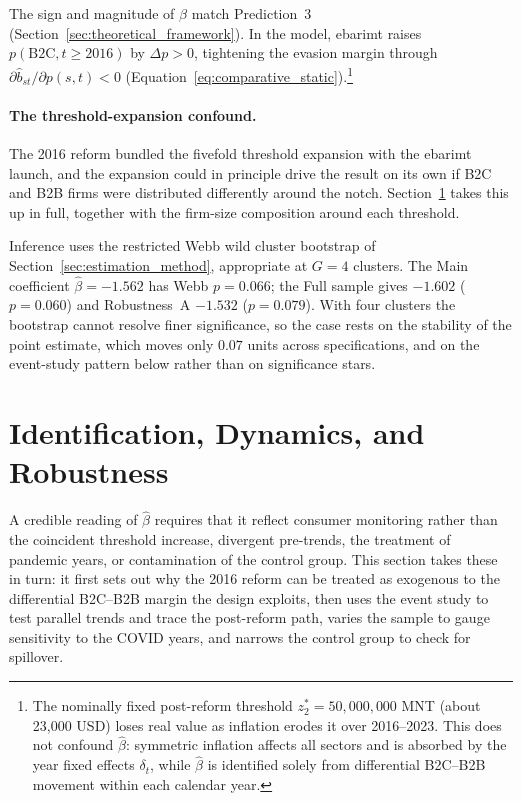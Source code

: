 \documentclass[12pt,oneside,a4paper]{report}
\begin{document}
The sign and magnitude of $\hat{\beta}$ match Prediction~3 (Section~\ref{sec:theoretical_framework}). In the model, ebarimt raises $p(\text{B2C}, t \geq 2016)$ by $\Delta p > 0$, tightening the evasion margin through $\partial\hat{b}_{st}/\partial p(s,t) < 0$ (Equation~\eqref{eq:comparative_static}).\footnote{The nominally fixed post-reform threshold $z_2^* = 50{,}000{,}000$ MNT (about 23,000 USD) loses real value as inflation erodes it over 2016--2023. This does not confound $\hat{\beta}$: symmetric inflation affects all sectors and is absorbed by the year fixed effects $\delta_t$, while $\hat{\beta}$ is identified solely from differential B2C--B2B movement within each calendar year.}

\paragraph{The threshold-expansion confound.}
The 2016 reform bundled the fivefold threshold expansion with the ebarimt launch, and the expansion could in principle drive the result on its own if B2C and B2B firms were distributed differently around the notch. Section~\ref{sec:event} takes this up in full, together with the firm-size composition around each threshold.

Inference uses the restricted Webb wild cluster bootstrap of Section~\ref{sec:estimation_method}, appropriate at $G = 4$ clusters. The Main coefficient $\hat{\beta} = -1.562$ has Webb $p = 0.066$; the Full sample gives $-1.602$ ($p = 0.060$) and Robustness~A $-1.532$ ($p = 0.079$). With four clusters the bootstrap cannot resolve finer significance, so the case rests on the stability of the point estimate, which moves only $0.07$ units across specifications, and on the event-study pattern below rather than on significance stars.


\section{Identification, Dynamics, and Robustness}
\label{sec:event}

A credible reading of $\hat{\beta}$ requires that it reflect consumer monitoring rather than the coincident threshold increase, divergent pre-trends, the treatment of pandemic years, or contamination of the control group. This section takes these in turn: it first sets out why the 2016 reform can be treated as exogenous to the differential B2C--B2B margin the design exploits, then uses the event study to test parallel trends and trace the post-reform path, varies the sample to gauge sensitivity to the COVID years, and narrows the control group to check for spillover.
\end{document}
